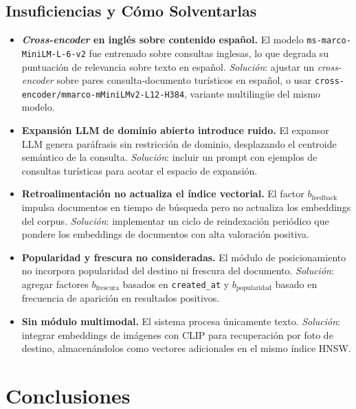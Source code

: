 \documentclass[runningheads]{llncs}
\begin{document}
\subsection{Insuficiencias y C\'omo Solventarlas}

\begin{itemize}
  \item \textbf{\textit{Cross-encoder} en ingl\'es sobre contenido
  espa\~nol.} El modelo \texttt{ms-marco-MiniLM-L-6-v2} fue entrenado
  sobre consultas inglesas, lo que degrada su puntuaci\'on de relevancia
  sobre texto en espa\~nol. \textit{Soluci\'on}: ajustar un
  \textit{cross-encoder} sobre pares consulta-documento tur\'isticos en
  espa\~nol, o usar \texttt{cross-encoder/mmarco-mMiniLMv2-L12-H384},
  variante multiling\"ue del mismo modelo.
  \item \textbf{Expansi\'on LLM de dominio abierto introduce ruido.}
  El expansor LLM genera par\'afrasis sin restricci\'on de dominio,
  desplazando el centroide sem\'antico de la consulta. \textit{Soluci\'on}:
  incluir un prompt con ejemplos de consultas tur\'isticas para acotar
  el espacio de expansi\'on.
  \item \textbf{Retroalimentaci\'on no actualiza el \'indice vectorial.}
  El factor $b_{\text{feedback}}$ impulsa documentos en tiempo de
  b\'usqueda pero no actualiza los embeddings del corpus. \textit{Soluci\'on}:
  implementar un ciclo de reindexaci\'on peri\'odico que pondere los
  embeddings de documentos con alta valoraci\'on positiva.
  \item \textbf{Popularidad y frescura no consideradas.} El m\'odulo de
  posicionamiento no incorpora popularidad del destino ni frescura del
  documento. \textit{Soluci\'on}: agregar factores $b_{\text{frescura}}$
  basados en \texttt{created\_at} y $b_{\text{popularidad}}$ basado en
  frecuencia de aparici\'on en resultados positivos.
  \item \textbf{Sin m\'odulo multimodal.} El sistema procesa
  \'unicamente texto. \textit{Soluci\'on}: integrar embeddings de
  im\'agenes con CLIP para recuperaci\'on por foto de destino,
  almacen\'andolos como vectores adicionales en el mismo \'indice HNSW.
\end{itemize}

\section{Conclusiones}
\label{sec:conclusions}
\end{document}
